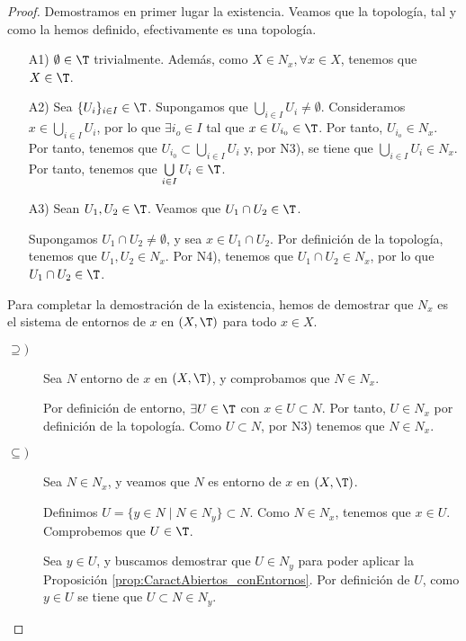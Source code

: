 \begin{proof}
    Demostramos en primer lugar la existencia. Veamos que la topología, tal y como la hemos definido, efectivamente es una topología.
    \begin{enumerate}
        \item[A1)] $\emptyset\in \T$ trivialmente. Además, como $X\in N_x, \forall x\in X$, tenemos que $X\in\T$.

        \item[A2)] Sea $\{U_i\}_{i\in I}\in \T$. Supongamos que $\bigcup\limits_{i\in I}U_i\neq \emptyset$. Consideramos $x\in \bigcup\limits_{i\in I}U_i$, por lo que $\exists i_o\in I$ tal que $x\in U_{i_0}\in \T$. Por tanto, $U_{i_o}\in N_x$. Por tanto, tenemos que $U_{i_0}\subset \bigcup\limits_{i\in I}U_i$ y, por N3), se tiene que $\bigcup\limits_{i\in I}U_i\in N_x$. Por tanto, tenemos que $\bigcup\limits_{i\in I}U_i\in \T$.

        \item[A3)] Sean $U_1, U_2\in \T$. Veamos que $U_1\cap U_2\in \T$.

        Supongamos $U_1\cap U_2\neq \emptyset$, y sea $x\in U_1\cap U_2$. Por definición de la topología, tenemos que $U_1,U_2\in N_x$. Por N4), tenemos que $U_1\cap U_2\in N_x$, por lo que $U_1\cap U_2\in \T$.
    \end{enumerate}

    Para completar la demostración de la existencia, hemos de demostrar que $N_x$ es el sistema de entornos de $x$ en $(X,\T)$ para todo $x\in X$.
    \begin{description}
        \item[$\supseteq)$] Sea $N$ entorno de $x$ en $(X,\T)$, y comprobamos que $N\in N_x$.

        Por definición de entorno, $\exists U\in \T$ con $x\in U\subset N$. Por tanto, $U\in N_x$ por definición de la topología.  Como $U\subset N$, por N3) tenemos que $N\in N_x$.

        \item[$\subseteq)$] Sea $N\in N_x$, y veamos que $N$ es entorno de $x$ en $(X,\T)$.

        Definimos $U=\{y\in N \mid N\in N_y\}\subset N$. Como $N\in N_x$, tenemos que $x\in U$. Comprobemos que $U\in \T$.

        Sea $y\in U$, y buscamos demostrar que $U\in N_y$ para poder aplicar la Proposición \ref{prop:CaractAbiertos_conEntornos}. Por definición de $U$, como $y\in U$ se tiene que $U\subset N\in N_y$.
        

\end{description}
\end{proof}
